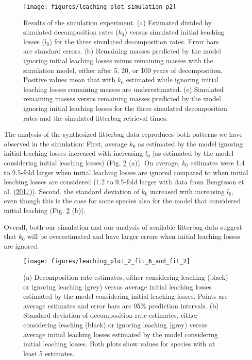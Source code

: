 \documentclass[
  12pt,
]{article}
\begin{document}
\begin{figure}[H]

{\centering \texttt{[image: figures/leaching\_plot\_simulation\_p2]} 

}

\caption{Results of the simulation experiment. (a) Estimated divided by simulated decomposition rates (\(k_0\)) versus simulated initial leaching losses (\(l_0\)) for the three simulated decomposition rates. Error bars are standard errors. (b) Remaining masses predicted by the model ignoring initial leaching losses minus remaining masses with the simulation model, either after 5, 20, or 100 years of decomposition. Positive values mean that with \(k_0\) estimated while ignoring initial leaching losses remaining masses are underestimated. (c) Simulated remaining masses versus remaining masses predicted by the model ignoring initial leaching losses for the three simulated decomposition rates and the simulated litterbag retrieval times.}\label{fig:out-p-simulation-p2}
\end{figure}

The analysis of the synthesized litterbag data reproduces both patterns we have observed in the simulation: First, average \(k_0\) as estimated by the model ignoring initial leaching losses increased with increasing \(l_0\) (as estimated by the model considering initial leaching losses) (Fig. \ref{fig:out-mm27-1-mm28-1-p2} (a)). On average, \(k_0\) estimates were 1.4 to 9.5-fold larger when initial leaching losses are ignored compared to when initial leaching losses are considered (1.2 to 9.5-fold larger with data from Bengtsson et al. (\protect\hyperlink{ref-Bengtsson.2017}{2017})). Second, the standard deviation of \(k_0\) increased with increasing \(l_0\), even though this is the case for some species also for the model that considered initial leaching (Fig. \ref{fig:out-mm27-1-mm28-1-p2} (b)).

Overall, both our simulation and our analysis of available litterbag data suggest that \(k_0\) will be overestimated and have larger errors when initial leaching losses are ignored.



\begin{figure}[H]

{\centering \texttt{[image: figures/leaching\_plot\_2\_fit\_6\_and\_fit\_2]} 

}

\caption{(a) Decomposition rate estimates, either considering leaching (black) or ignoring leaching (grey) versus average initial leaching losses estimated by the model considering initial leaching losses. Points are average estimates and error bars are 95\% prediction intervals. (b) Standard deviation of decomposition rate estimates, either considering leaching (black) or ignoring leaching (grey) versus average initial leaching losses estimated by the model considering initial leaching losses. Both plots show values for species with at least 5 estimates.}\label{fig:out-mm27-1-mm28-1-p2}
\end{figure}
\end{document}
